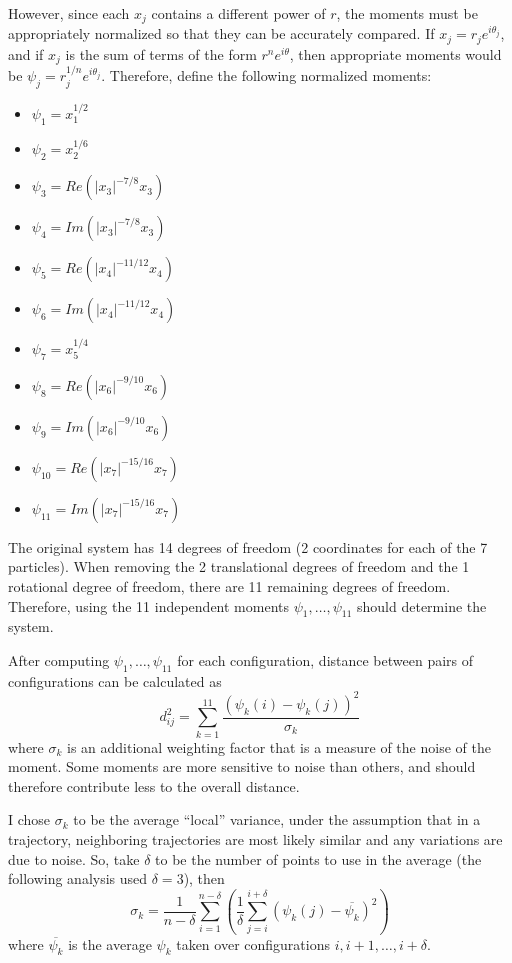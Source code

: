 However, since each $x_{j}$ contains a different power of $r$, the moments must be appropriately normalized so that they can be accurately compared. If $x_{j}=r_{j}e^{i\theta_{j}}$, and if $x_{j}$ is the sum of terms of the form $r^{n}e^{i\theta}$, then appropriate moments would be $\psi_{j}=r_{j}^{1/n}e^{i\theta_j}$. Therefore, define the following normalized moments:
\begin{itemize}
\item $\psi_1=x_1^{1/2}$
\item $\psi_2=x_2^{1/6}$
\item $\psi_3=Re(|x_3|^{-7/8}x_{3})$
\item $\psi_4=Im(|x_3|^{-7/8}x_{3})$
\item $\psi_5=Re(|x_4|^{-11/12}x_{4})$
\item $\psi_6=Im(|x_4|^{-11/12}x_{4})$
\item $\psi_7=x_5^{1/4}$
\item $\psi_8=Re(|x_6|^{-9/10}x_{6})$
\item $\psi_9=Im(|x_6|^{-9/10}x_{6})$
\item $\psi_{10}=Re(|x_7|^{-15/16}x_{7})$
\item $\psi_{11}=Im(|x_7|^{-15/16}x_{7})$
\end{itemize}

The original system has 14 degrees of freedom (2 coordinates for each of the 7 particles). When removing the 2 translational degrees of freedom and the 1 rotational degree of freedom, there are 11 remaining degrees of freedom. Therefore, using the 11 independent moments $\psi_1,\dots,\psi_{11}$ should determine the system.

After computing $\psi_1,\dots,\psi_{11}$ for each configuration, distance between pairs of configurations can be calculated as
$$d^2_{ij}=\sum_{k=1}^{11}\frac{\left(\psi_{k}(i)-\psi_{k}(j)\right)^{2}}{\sigma_k}$$
where $\sigma_k$ is an additional weighting factor that is a measure of the noise of the moment. Some moments are more sensitive to noise than others, and should therefore contribute less to the overall distance. 

I chose $\sigma_k$ to be the average ``local'' variance, under the assumption that in a trajectory, neighboring trajectories are most likely similar and any variations are due to noise. So, take $\delta$ to be the number of points to use in the average (the following analysis used $\delta=3$), then
$$\sigma_k=\frac{1}{n-\delta}\sum_{i=1}^{n-\delta}\left(\frac{1}{\delta}\sum_{j=i}^{i+\delta}(\psi_{k}(j)-\overline{\psi_{k}})^{2}\right)$$
where $\overline{\psi_{k}}$ is the average $\psi_{k}$ taken over configurations $i, i+1,\dots,i+\delta$. 

